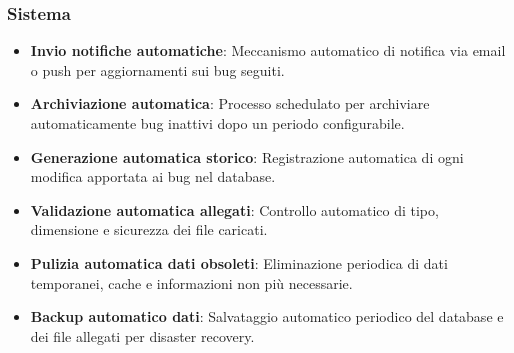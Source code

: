 \subsubsection{Sistema}
\begin{itemize}
    \item \textbf{Invio notifiche automatiche}: Meccanismo automatico di notifica via email o push per aggiornamenti sui bug seguiti.
    \item \textbf{Archiviazione automatica}: Processo schedulato per archiviare automaticamente bug inattivi dopo un periodo configurabile.
    \item \textbf{Generazione automatica storico}: Registrazione automatica di ogni modifica apportata ai bug nel database.
    \item \textbf{Validazione automatica allegati}: Controllo automatico di tipo, dimensione e sicurezza dei file caricati.
    \item \textbf{Pulizia automatica dati obsoleti}: Eliminazione periodica di dati temporanei, cache e informazioni non più necessarie.
    \item \textbf{Backup automatico dati}: Salvataggio automatico periodico del database e dei file allegati per disaster recovery.
\end{itemize}

